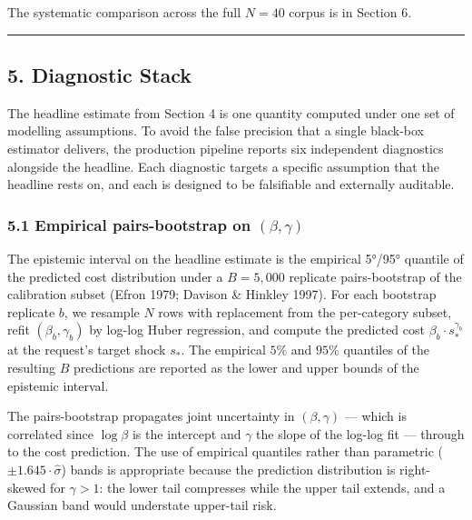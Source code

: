 \documentclass[
]{article}
\begin{document}
The systematic comparison across the full \(N=40\) corpus is in Section
6.

\begin{center}\rule{0.5\linewidth}{0.5pt}\end{center}

\subsection{5. Diagnostic Stack}\label{diagnostic-stack}

The headline estimate from Section 4 is one quantity computed under one
set of modelling assumptions. To avoid the false precision that a single
black-box estimator delivers, the production pipeline reports six
independent diagnostics alongside the headline. Each diagnostic targets
a specific assumption that the headline rests on, and each is designed
to be falsifiable and externally auditable.

\subsubsection{\texorpdfstring{5.1 Empirical pairs-bootstrap on
\((\beta, \gamma)\)}{5.1 Empirical pairs-bootstrap on (\textbackslash beta, \textbackslash gamma)}}\label{empirical-pairs-bootstrap-on-beta-gamma}

The epistemic interval on the headline estimate is the empirical 5°/95°
quantile of the predicted cost distribution under a \(B = 5{,}000\)
replicate pairs-bootstrap of the calibration subset (Efron 1979; Davison
\& Hinkley 1997). For each bootstrap replicate \(b\), we resample \(N\)
rows with replacement from the per-category subset, refit
\((\beta_b, \gamma_b)\) by log-log Huber regression, and compute the
predicted cost \(\beta_b \cdot s_*^{\gamma_b}\) at the request's target
shock \(s_*\). The empirical \(5\%\) and \(95\%\) quantiles of the
resulting \(B\) predictions are reported as the lower and upper bounds
of the epistemic interval.

The pairs-bootstrap propagates joint uncertainty in \((\beta, \gamma)\)
--- which is correlated since \(\log \beta\) is the intercept and
\(\gamma\) the slope of the log-log fit --- through to the cost
prediction. The use of empirical quantiles rather than parametric
(\(\pm 1.645 \cdot \hat{\sigma}\)) bands is appropriate because the
prediction distribution is right-skewed for \(\gamma > 1\): the lower
tail compresses while the upper tail extends, and a Gaussian band would
understate upper-tail risk.
\end{document}
